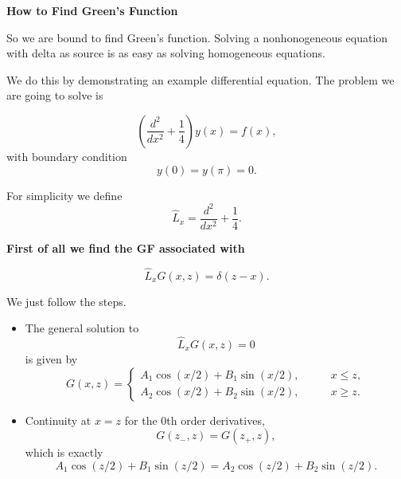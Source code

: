 \begin{framed}


{\bf How to Find Green's Function}
\vspace{1em}

So we are bound to find Green's function. Solving a nonhonogeneous equation with delta as source is as easy as solving homogeneous equations.

We do this by demonstrating an example differential equation. The problem we are going to solve is

\begin{equation*}
    \left(\frac{d^2}{dx^2} + \frac{1}{4}\right) y(x) = f(x),
\end{equation*}
with boundary condition
\begin{equation}
y(0) = y(\pi) = 0.\label{eqn-green-function-example2-bc}
\end{equation}


For simplicity we define 
\begin{equation*}
    \hat L_x = \frac{d^2}{dx^2} + \frac{1}{4}.
\end{equation*}

{\bf First of all we find the GF associated with}

\begin{equation*}
    \hat L_x G(x,z) = \delta(z-x).
\end{equation*}

We just follow the steps.

\begin{itemize}
\item The general solution to 
    \begin{equation*}
        \hat L_x G(x,z) = 0
    \end{equation*}
    is given by
    \begin{equation*}
        G(x,z) = \begin{cases}
        A_1\cos (x/2) + B_1 \sin(x/2), & \qquad x \leq z, \\
        A_2\cos (x/2) + B_2 \sin(x/2), & \qquad x \geq z.
        \end{cases}
    \end{equation*}



\item Continuity at $x=z$ for the 0th order derivatives,
\begin{equation*}
    G(z_-,z) = G(z_+,z),
\end{equation*}
which is exactly
\begin{equation}
    A_1\cos(z/2) + B_1 \sin(z/2) = A_2 \cos(z/2) + B_2\sin(z/2).\label{eqn-green-function-example2-continuity}
\end{equation}


\end{itemize}
\end{framed}

